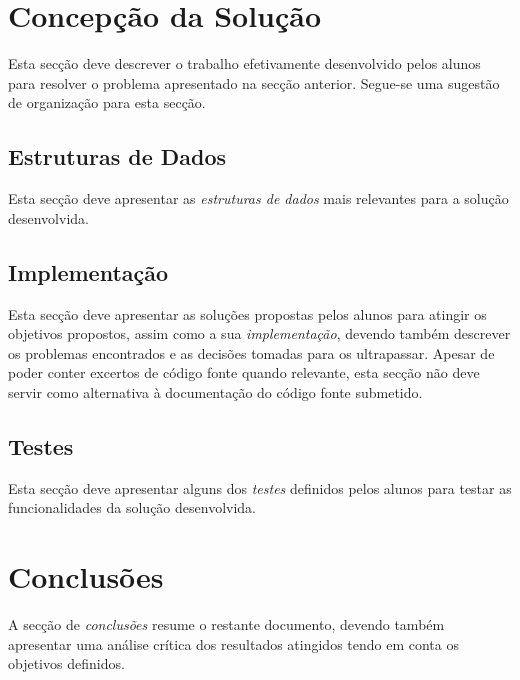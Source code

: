 \documentclass[a4paper]{article}
\begin{document}
\section{Concepção da Solução}
\label{sec:solucao}

Esta secção deve descrever o trabalho efetivamente desenvolvido pelos
alunos para resolver o problema apresentado na secção
anterior. Segue-se uma sugestão de organização para esta secção.

\subsection{Estruturas de Dados}

Esta secção deve apresentar as \emph{estruturas de dados} mais
relevantes para a solução desenvolvida.

\subsection{Implementação}

Esta secção deve apresentar as soluções propostas pelos alunos para
atingir os objetivos propostos, assim como a sua \emph{implementação},
devendo também descrever os problemas encontrados e as decisões
tomadas para os ultrapassar. Apesar de poder conter excertos de código
fonte quando relevante, esta secção não deve servir como alternativa à
documentação do código fonte submetido.

\subsection{Testes}

Esta secção deve apresentar alguns dos \emph{testes} definidos pelos
alunos para testar as funcionalidades da solução desenvolvida.

\section{Conclusões}
\label{sec:conclusao}

A secção de \emph{conclusões} resume o restante documento, devendo
também apresentar uma análise crítica dos resultados atingidos tendo
em conta os objetivos definidos.
\end{document}
